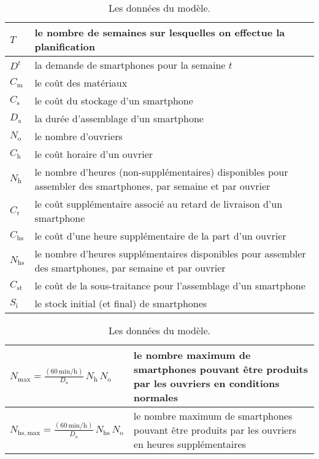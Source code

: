 

\begin{table}\label{tab:donnees}
    \centering
    \begin{tabular}{|>{\centering}p{1cm}|m{12cm}|}
        \hline
        $T$ & le nombre de semaines sur lesquelles on effectue la planification \\
        \hline
        $D^t$ & la demande de smartphones pour la semaine $t$ \\
        \hline
        $C_\mathrm{m}$ & le coût des matériaux \\
        \hline
        $C_\mathrm{s}$ & le coût du stockage d'un smartphone \\
        \hline
        $D_\mathrm{a}$ & la durée d'assemblage d'un smartphone \\
        \hline
        $N_\mathrm{o}$ & le nombre d'ouvriers \\
        \hline
        $C_\mathrm{h}$ & le coût horaire d'un ouvrier \\
        \hline
        $N_\mathrm{h}$ & le nombre d'heures (non-supplémentaires) disponibles pour assembler des smartphones, par semaine et par ouvrier \\
        \hline
        $C_\mathrm{r}$ & le coût supplémentaire associé au retard de livraison d'un smartphone \\
        \hline
        $C_\mathrm{hs}$ & le coût d'une heure supplémentaire de la part d'un ouvrier \\
        \hline
        $N_\mathrm{hs}$ & le nombre d'heures supplémentaires disponibles pour assembler des smartphones, par semaine et par ouvrier \\
        \hline
        $C_\mathrm{st}$ & le coût de la sous-traitance pour l'assemblage d'un smartphone \\
        \hline
        $S_\mathrm{i}$ & le stock initial (et final) de smartphones \\
        \hline
    \end{tabular}
    \begin{tabular}{|>{\centering}p{6cm}|m{7cm}|}
        \hline
        $\displaystyle N_\mathrm{max} = \frac{(60 \,\mathrm{min/h})}{D_\mathrm{a}}\,N_\mathrm{h}\,N_\mathrm{o}$ & le nombre maximum de smartphones pouvant être produits par les ouvriers en conditions normales \\
        \hline
        $\displaystyle N_\mathrm{hs,max} = \frac{(60 \,\mathrm{min/h})}{D_\mathrm{a}}\,N_\mathrm{hs}\,N_\mathrm{o}$ & le nombre maximum de smartphones pouvant être produits par les ouvriers en heures supplémentaires \\
        \hline
    \end{tabular}
    \caption{Les données du modèle.}
\end{table}

